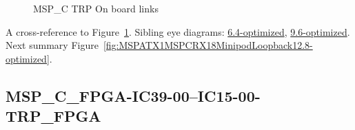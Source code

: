 \begin{figure}[h]
\begin{subfigure}{0.25\textwidth}
\hyperref[sec:MSPCFPGAIC3924IC1524TRPFPGA12.8-optimized]{}
\end{subfigure}\hspace*{\fill}
\begin{subfigure}{0.25\textwidth}
\hyperref[sec:MSPCFPGAIC3925IC1525TRPFPGA12.8-optimized]{}
\end{subfigure}\hspace*{\fill}
\begin{subfigure}{0.25\textwidth}
\hyperref[sec:MSPCFPGAIC3926IC1526TRPFPGA12.8-optimized]{}
\end{subfigure}\hspace*{\fill}
\begin{subfigure}{0.25\textwidth}
\hyperref[sec:MSPCFPGAIC3927IC1527TRPFPGA12.8-optimized]{}
\end{subfigure}

\caption{MSP\_C TRP On board links} \label{fig:MSPCTRPOnboardlinks12.8-optimized}
\end{figure}

A cross-reference to Figure~\ref{fig:MSPCTRPOnboardlinks12.8-optimized}.
Sibling eye diagrams: \hyperref[sec:MSPCTRPOnboardlinks6.4-optimized]{6.4-optimized}, \hyperref[sec:MSPCTRPOnboardlinks9.6-optimized]{9.6-optimized}. \\
Next summary Figure~\ref{fig:MSPATX1MSPCRX18MinipodLoopback12.8-optimized}.
\clearpage
% 
\subsection{MSP\_C\_FPGA-IC39-00--IC15-00-TRP\_FPGA}\label{sec:MSPCFPGAIC3900IC1500TRPFPGA12.8-optimized}

